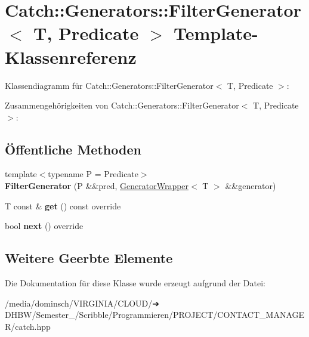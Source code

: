 \hypertarget{classCatch_1_1Generators_1_1FilterGenerator}{}\section{Catch\+:\+:Generators\+:\+:Filter\+Generator$<$ T, Predicate $>$ Template-\/\+Klassenreferenz}
\label{classCatch_1_1Generators_1_1FilterGenerator}


Klassendiagramm für Catch\+:\+:Generators\+:\+:Filter\+Generator$<$ T, Predicate $>$\+:


Zusammengehörigkeiten von Catch\+:\+:Generators\+:\+:Filter\+Generator$<$ T, Predicate $>$\+:
\subsection*{Öffentliche Methoden}
\begin{DoxyCompactItemize}
\item 
\mbox{\label{classCatch_1_1Generators_1_1FilterGenerator_aa16886a5e41cbd3b6ffa3dd52388a3a1}} 
{\footnotesize template$<$typename P  = Predicate$>$ }\\{\bfseries Filter\+Generator} (P \&\&pred, \hyperlink{classCatch_1_1Generators_1_1GeneratorWrapper}{Generator\+Wrapper}$<$ T $>$ \&\&generator)
\item 
\mbox{\label{classCatch_1_1Generators_1_1FilterGenerator_ab30e81b61a77430661d40f814758f6fe}} 
T const  \& {\bfseries get} () const override
\item 
\mbox{\label{classCatch_1_1Generators_1_1FilterGenerator_a02ce0839dcaa7545c55d0fe70cc50e84}} 
bool {\bfseries next} () override
\end{DoxyCompactItemize}
\subsection*{Weitere Geerbte Elemente}


Die Dokumentation für diese Klasse wurde erzeugt aufgrund der Datei\+:\begin{DoxyCompactItemize}
\item 
/media/dominsch/\+V\+I\+R\+G\+I\+N\+I\+A/\+C\+L\+O\+U\+D/➔ D\+H\+B\+W/\+Semester\+\_/\+Scribble/\+Programmieren/\+P\+R\+O\+J\+E\+C\+T/\+C\+O\+N\+T\+A\+C\+T\+\_\+\+M\+A\+N\+A\+G\+E\+R/catch.\+hpp\end{DoxyCompactItemize}
